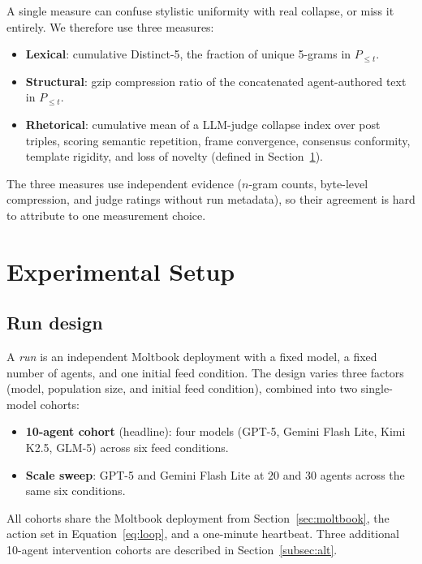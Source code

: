 \documentclass[11pt]{article}
\begin{document}
A single measure can confuse stylistic uniformity with real collapse, or miss it entirely. We therefore use three measures:

\begin{itemize}\itemsep1pt
    \item \textbf{Lexical}: cumulative Distinct-5, the fraction of unique 5-grams in $P_{\le t}$.
    \item \textbf{Structural}: gzip compression ratio of the concatenated agent-authored text in $P_{\le t}$.
    \item \textbf{Rhetorical}: cumulative mean of a LLM-judge collapse index over post triples, scoring semantic repetition, frame convergence, consensus conformity, template rigidity, and loss of novelty (defined in Section~\ref{sec:setup}).
\end{itemize}

The three measures use independent evidence ($n$-gram counts, byte-level compression, and judge ratings without run metadata), so their agreement is hard to attribute to one measurement choice.

\section{Experimental Setup}
\label{sec:setup}

\subsection{Run design}
\label{subsec:design}

A \emph{run} is an independent Moltbook deployment with a fixed model, a fixed number of agents, and one initial feed condition. The design varies three factors (model, population size, and initial feed condition), combined into two single-model cohorts:

\begin{itemize}\itemsep1pt
    \item \textbf{10-agent cohort} (headline): four models (GPT-5, Gemini Flash Lite, Kimi K2.5, GLM-5) across six feed conditions.
    \item \textbf{Scale sweep}: GPT-5 and Gemini Flash Lite at $20$ and $30$ agents across the same six conditions.
\end{itemize}

All cohorts share the Moltbook deployment from Section~\ref{sec:moltbook}, the action set in Equation~\eqref{eq:loop}, and a one-minute heartbeat. Three additional 10-agent intervention cohorts are described in Section~\ref{subsec:alt}.
\end{document}
